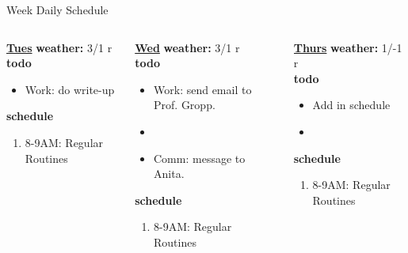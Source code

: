 \begin{columns}
\begin{column}{0.5\columnwidth}
\begin{columns}
\begin{column}{0.6\linewidth}
\begin{block}{Week Daily Schedule}
\begin{columns}
          \begin{column}{0.14\textwidth}{\small \underline{\bf Tues}}
            {\bf {\tiny  weather:} } {\tiny 3/1 r} \\ 
            {\bf {\tiny todo}}\\ 
            \begin{itemize}
              \tiny \item \tiny Work: do write-up 
            \end{itemize} 
                {{\bf {\tiny  schedule}}}
                \begin{enumerate} 
                  \tiny \item \tiny 8-9AM: Regular Routines 
                \end{enumerate} 
          \end{column}
          \begin{column}{0.14\textwidth}{\small \underline{\bf Wed}}
            {\tiny \bf weather: } {\tiny 3/1 r} \\ 
            {\tiny {\bf todo}}\\
            \begin{itemize}
              \tiny \item \tiny Work: send email to Prof. Gropp. 
            \item \tiny 
            \item \tiny Comm: message to Anita. 
            \end{itemize}
                {\tiny \bf schedule}\\
                \begin{enumerate} 
                  \tiny \item \tiny 8-9AM: Regular Routines 
                \end{enumerate} 
          \end{column}

          \begin{column}{0.14\textwidth}{\small \underline{\bf Thurs}}
            {\tiny \bf weather: } {\tiny 1/-1 r }\\ 
            {\tiny \bf todo} \\ 
            \begin{itemize}
              \tiny \item \tiny Add in schedule
            \item \tiny 
            \end{itemize} 
                {\tiny {\bf schedule}} \\
                \begin{enumerate} 
                  \tiny \item \tiny 8-9AM: Regular Routines 
                \end{enumerate}
          \end{column} 
          

\end{columns}
\end{block}
\end{column}
\end{columns}
\end{column}
\end{columns}
